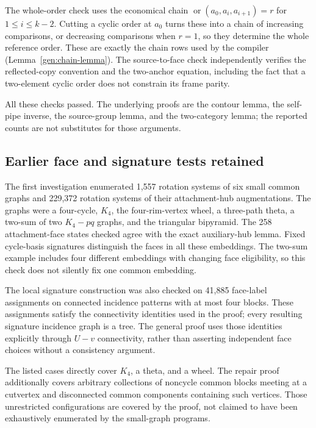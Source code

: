 The whole-order check uses the economical chain
$\operatorname{or}(a_0,a_i,a_{i+1})=r$ for $1\le i\le k-2$.
Cutting a cyclic order at $a_0$ turns these into a chain of increasing
comparisons, or decreasing comparisons when $r=1$, so they determine the
whole reference order. These are exactly the chain rows used by the
compiler (Lemma~\ref{gen:chain-lemma}). The source-to-face
check independently verifies the reflected-copy convention and the
two-anchor equation, including the fact that a two-element cyclic order
does not constrain its frame parity.

All these checks passed. The underlying proofs are the contour lemma,
the self-pipe inverse, the source-group lemma, and the two-category lemma;
the reported counts are not substitutes for those arguments.

\subsection{Earlier face and signature tests retained}

The first investigation enumerated 1,557 rotation systems of six small
common graphs and 229,372 rotation systems of their attachment-hub
augmentations. The graphs were a four-cycle, $K_4$, the four-rim-vertex
wheel, a three-path theta, a two-sum of two $K_4-pq$ graphs, and the
triangular bipyramid. The 258 attachment-face states checked agree with
the exact auxiliary-hub lemma. Fixed cycle-basis signatures distinguish
the faces in all these embeddings. The two-sum example includes four
different embeddings with changing face eligibility, so this check does
not silently fix one common embedding.

The local signature construction was also checked on 41,885 face-label
assignments on connected incidence patterns with at most four blocks.
These assignments satisfy the connectivity identities used in the proof;
every resulting signature incidence graph is a tree. The general proof
uses those identities explicitly through $U-v$ connectivity, rather than
asserting independent face choices without a consistency argument.

The listed cases directly cover $K_4$, a theta, and a wheel. The repair
proof additionally covers arbitrary collections of noncycle common blocks
meeting at a cutvertex and disconnected common components containing such
vertices. Those unrestricted configurations are covered by the proof, not
claimed to have been exhaustively enumerated by the small-graph programs.

